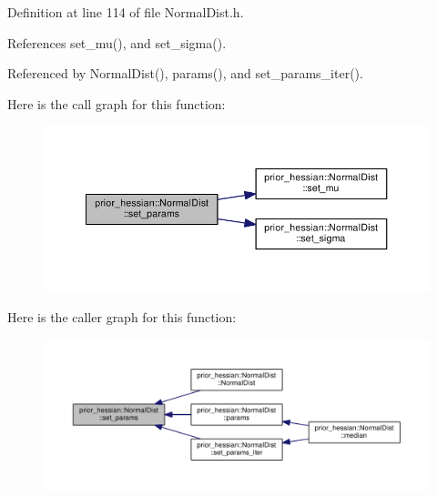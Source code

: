 Definition at line 114 of file Normal\+Dist.\+h.



References set\+\_\+mu(), and set\+\_\+sigma().



Referenced by Normal\+Dist(), params(), and set\+\_\+params\+\_\+iter().



Here is the call graph for this function\+:\nopagebreak
\begin{figure}[H]
\begin{center}
\leavevmode
\includegraphics[width=350pt]{classprior__hessian_1_1NormalDist_a352979a2485cd990786ae53db6d64123_cgraph}
\end{center}
\end{figure}




Here is the caller graph for this function\+:\nopagebreak
\begin{figure}[H]
\begin{center}
\leavevmode
\includegraphics[width=350pt]{classprior__hessian_1_1NormalDist_a352979a2485cd990786ae53db6d64123_icgraph}
\end{center}
\end{figure}


